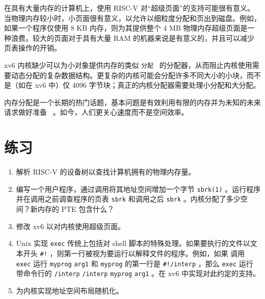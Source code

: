 \documentclass[UTF8]{article}
\begin{document}
在具有大量内存的计算机上，使用 RISC-V 对“超级页面”的支持可能很有意义。当物理内存较小时，小页面很有意义，以允许以细粒度分配和页出到磁盘。例如，如果一个程序仅使用 8 KB 内存，则为其提供整个 4 MB 物理内存超级页面是一种浪费。较大的页面对于具有大量 RAM 的机器来说是有意义的，并且可以减少页表操作的开销。  

xv6 内核缺少可以为小对象提供内存的类似  {    \tt    分配   }  的分配器，从而阻止内核使用需要动态分配的复杂数据结构。更复杂的内核可能会分配许多不同大小的小块，而不是（如在 xv6 中）仅 4096 字节块；真正的内核分配器需要处理小分配和大分配。  

内存分配是一个长期的热门话题，基本问题是有效利用有限的内存并为未知的未来请求做好准备~    \cite{knuth}    。如今，人们更关心速度而不是空间效率。
    \section{练习  }     

   \begin{enumerate}

 
   \item   解析 RISC-V 的设备树以查找计算机拥有的物理内存量。   \item   编写一个用户程序，通过调用将其地址空间增加一个字节
    \lstinline{sbrk(1)}    。运行程序并在调用之前调查程序的页表
    \lstinline{sbrk}    和调用之后
    \lstinline{sbrk}    。内核分配了多少空间？新内存的 PTE 包含什么？   \item   修改 xv6 以对内核使用超级页面。   \item   Unix 实现
    \lstinline{exec}    传统上包括对 shell 脚本的特殊处理。如果要执行的文件以文本开头
    \lstinline{#!}    ，则第一行被视为要运行以解释文件的程序。例如，如果
 调用   \lstinline{exec}   运行
    \lstinline{myprog}   
    \lstinline{arg1}    和
    \lstinline{myprog}    的第一行是
    \lstinline{#!/interp}   ，那么
    \lstinline{exec}    运行
 带命令行的    \lstinline{/interp}   
    \lstinline{/interp}   
    \lstinline{myprog}   
    \lstinline{arg1}    。在 xv6 中实现对此约定的支持。   \item   为内核实现地址空间布局随机化。  \end{enumerate}     
\end{document}
